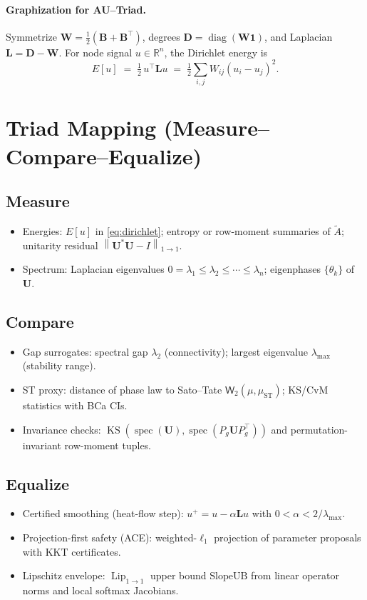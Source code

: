\documentclass[11pt]{article}
\newcommand{\R}{\mathbb{R}}
\newcommand{\one}{\mathbf{1}}
\newcommand{\Id}{I}
\newcommand{\diag}{\operatorname{diag}}
\newcommand{\norm}[1]{\left\lVert #1 \right\rVert}
\newcommand{\Lip}{\operatorname{Lip}}
\newcommand{\KS}{\operatorname{KS}}
\newcommand{\W}{\mathsf{W}}
\newcommand{\bB}{\mathbf{B}}
\newcommand{\bU}{\mathbf{U}}
\newcommand{\bL}{\mathbf{L}}
\newcommand{\bD}{\mathbf{D}}
\newcommand{\bW}{\mathbf{W}}
\newcommand{\spec}{\operatorname{spec}}
\begin{document}
\paragraph{Graphization for AU--Triad.}
Symmetrize $\bW=\tfrac12(\bB+\bB^\top)$, degrees $\bD=\diag(\bW\one)$, and Laplacian $\bL=\bD-\bW$. For node signal $u\in\R^n$, the Dirichlet energy is
\begin{equation}\label{eq:dirichlet}
E[u] \;=\; \tfrac12\, u^\top \bL u \;=\; \tfrac12\sum_{i,j} W_{ij}(u_i-u_j)^2.
\end{equation}

\section{Triad Mapping (Measure--Compare--Equalize)}
\subsection*{Measure}
\begin{itemize}[leftmargin=2em]
\item Energies: $E[u]$ in \eqref{eq:dirichlet}; entropy or row-moment summaries of $\tilde A$; unitarity residual $\norm{\bU^*\bU-\Id}_{1\to 1}$.
\item Spectrum: Laplacian eigenvalues $0=\lambda_1\le \lambda_2\le \cdots\le \lambda_n$; eigenphases $\{\theta_k\}$ of $\bU$.
\end{itemize}

\subsection*{Compare}
\begin{itemize}[leftmargin=2em]
\item Gap surrogates: spectral gap $\lambda_2$ (connectivity); largest eigenvalue $\lambda_{\max}$ (stability range).
\item ST proxy: distance of phase law to Sato--Tate $\W_2(\mu,\mu_{\mathrm{ST}})$; KS/CvM statistics with BCa CIs.
\item Invariance checks: $\KS(\spec(\bU),\spec(P_g \bU P_g^\top))$ and permutation-invariant row-moment tuples.
\end{itemize}

\subsection*{Equalize}
\begin{itemize}[leftmargin=2em]
\item Certified smoothing (heat-flow step): $u^+=u-\alpha \bL u$ with $0<\alpha<2/\lambda_{\max}$.
\item Projection-first safety (ACE): weighted-$\ell_1$ projection of parameter proposals with KKT certificates.
\item Lipschitz envelope: $\Lip_{1\to 1}$ upper bound $\mathrm{SlopeUB}$ from linear operator norms and local softmax Jacobians.
\end{itemize}
\end{document}
